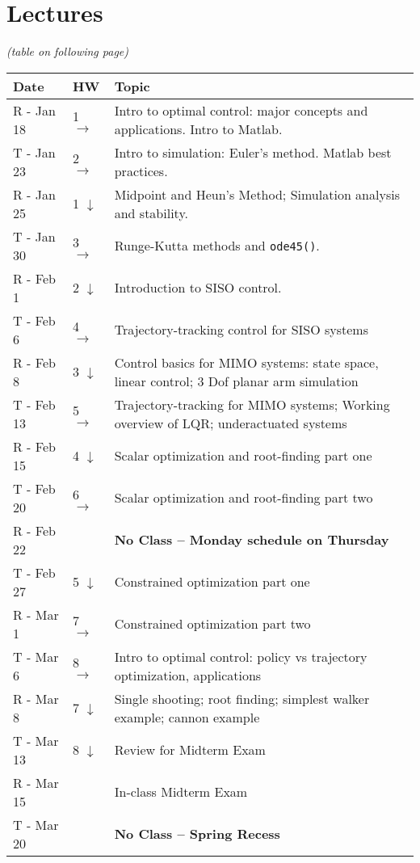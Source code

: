 \documentclass[onecolumn]{article}
\newcommand{\ra}{$\rightarrow$}
\newcommand{\da}{$\downarrow$}
\begin{document}
\section*{Lectures}
\textit{(table on following page)}
\begin{table}
  \renewcommand{\arraystretch}{1.2}%
  \begin{tabular}{l|l|l}
    \textbf{Date} & \textbf{HW} & \textbf{Topic} \\
    \hline
    R - Jan 18 & 1 \ra & Intro to optimal control: major concepts and applications. Intro to Matlab. \\
    \hline
    T - Jan 23 & 2 \ra & Intro to simulation: Euler's method. Matlab best practices. \\
    R - Jan 25 & 1 \da & Midpoint and Heun's Method; Simulation analysis and stability.\\
    T - Jan 30 & 3 \ra & Runge-Kutta methods and \texttt{ode45()}.\\
    \hline
    R - Feb 1  & 2 \da & Introduction to SISO control. \\
    T - Feb 6  & 4 \ra & Trajectory-tracking control for SISO systems \\
    R - Feb 8  & 3 \da & Control basics for MIMO systems: state space, linear control; 3 Dof planar arm simulation  \\
    T - Feb 13 & 5 \ra & Trajectory-tracking for MIMO systems; Working overview of LQR; underactuated systems \\
    \hline
    R - Feb 15 & 4 \da &  Scalar optimization and root-finding part one\\
    T - Feb 20 & 6 \ra &  Scalar optimization and root-finding part two\\
    R - Feb 22 &       & \textbf{No Class -- Monday schedule on Thursday} \\
    T - Feb 27 & 5 \da & Constrained optimization part one \\
    R - Mar 1  & 7 \ra & Constrained optimization part two \\
    \hline
    T - Mar 6  & 8 \ra & Intro to optimal control: policy vs trajectory optimization, applications \\
    R - Mar 8  & 7 \da & Single shooting; root finding; simplest walker example; cannon example \\
    T - Mar 13 & 8 \da & Review for Midterm Exam \\
    R - Mar 15 &       & In-class Midterm Exam \\
    \hline
    T - Mar 20 &       & \textbf{No Class -- Spring Recess} \\

\end{tabular}
\end{table}
\end{document}

